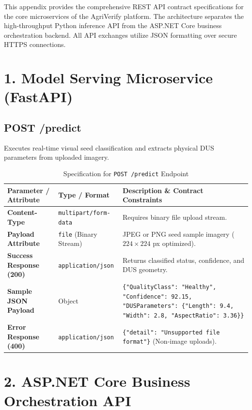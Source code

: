 This appendix provides the comprehensive REST API contract specifications for the core microservices of the AgriVerify platform. The architecture separates the high-throughput Python inference API from the ASP.NET Core business orchestration backend. All API exchanges utilize JSON formatting over secure HTTPS connections.

\section*{1. Model Serving Microservice (FastAPI)}

\subsection*{POST /predict}
Executes real-time visual seed classification and extracts physical DUS parameters from uploaded imagery.

\begin{table}[htbp]
  \centering
  \caption{Specification for \texttt{POST /predict} Endpoint}
  \label{tab:api-predict}
  \renewcommand{\arraystretch}{1.35}
  \begin{tabularx}{\textwidth}{@{} l l X @{}}
    \toprule
    \textbf{Parameter / Attribute} & \textbf{Type / Format} & \textbf{Description \& Contract Constraints} \\
    \midrule
    \textbf{Content-Type} & \texttt{multipart/form-data} & Requires binary file upload stream. \\
    \addlinespace
    \textbf{Payload Attribute} & \texttt{file} (Binary Stream) & JPEG or PNG seed sample imagery ($224 \times 224$ px optimized). \\
    \addlinespace
    \textbf{Success Response (200)} & \texttt{application/json} & Returns classified status, confidence, and DUS geometry. \\
    \addlinespace
    \textbf{Sample JSON Payload} & Object & \texttt{\{"QualityClass": "Healthy", "Confidence": 92.15, "DUSParameters": \{"Length": 9.4, "Width": 2.8, "AspectRatio": 3.36\}\}} \\
    \addlinespace
    \textbf{Error Response (400)} & \texttt{application/json} & \texttt{\{"detail": "Unsupported file format"\}} (Non-image uploads). \\
    \bottomrule
  \end{tabularx}
\end{table}

\section*{2. ASP.NET Core Business Orchestration API}

